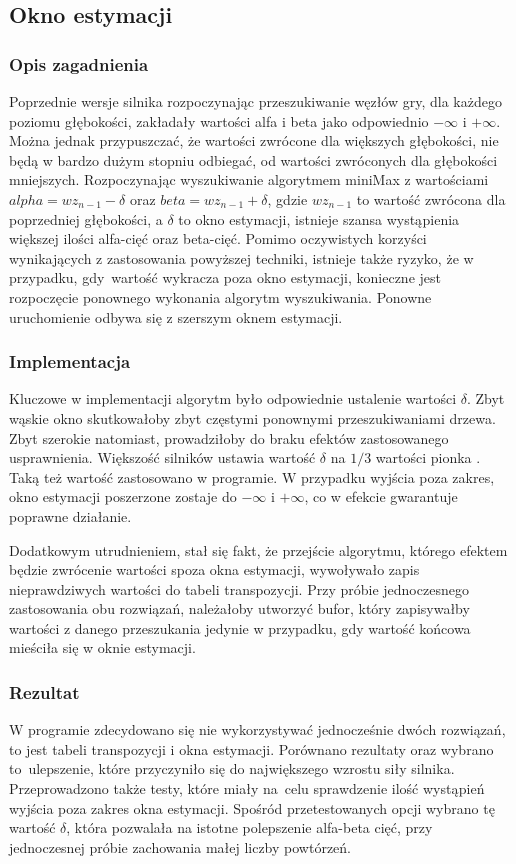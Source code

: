 \subsection{Okno estymacji}
\label{subsec:okno-estymacji}

\subsubsection{Opis zagadnienia}
Poprzednie wersje silnika rozpoczynając przeszukiwanie węzłów gry, dla każdego poziomu głębokości, zakładały wartości alfa i beta jako odpowiednio $-\infty$ i $+\infty$.
Można jednak przypuszczać, że wartości zwrócone dla większych głębokości, nie będą w bardzo dużym stopniu odbiegać, od wartości zwróconych dla głębokości mniejszych.
Rozpoczynając wyszukiwanie algorytmem miniMax z wartościami $alpha = wz_{n-1} - \delta$ oraz $beta = wz_{n-1} + \delta$, gdzie $wz_{n-1}$ to wartość zwrócona dla poprzedniej głębokości, a $\delta$ to okno estymacji, istnieje szansa wystąpienia większej ilości alfa-cięć oraz beta-cięć.
Pomimo oczywistych korzyści wynikających z zastosowania powyższej techniki, istnieje także ryzyko, że w przypadku, gdy~wartość wykracza poza okno estymacji, konieczne jest rozpoczęcie ponownego wykonania algorytm wyszukiwania.
Ponowne uruchomienie odbywa się z szerszym oknem estymacji.

\subsubsection{Implementacja}
Kluczowe w implementacji algorytm było odpowiednie ustalenie wartości $\delta$.
Zbyt wąskie okno skutkowałoby zbyt częstymi ponownymi przeszukiwaniami drzewa.
Zbyt szerokie natomiast, prowadziłoby do braku efektów zastosowanego usprawnienia.
Większość silników ustawia wartość $\delta$ na $1/3$ wartości pionka \cite*{duch}.
Taką też wartość zastosowano w programie.
W przypadku wyjścia poza zakres, okno estymacji poszerzone zostaje do $-\infty$ i $+\infty$, co w efekcie gwarantuje poprawne działanie.

Dodatkowym utrudnieniem, stał się fakt, że przejście algorytmu, którego efektem będzie zwrócenie wartości spoza okna estymacji, wywoływało zapis nieprawdziwych wartości do tabeli transpozycji.
Przy próbie jednoczesnego zastosowania obu rozwiązań, należałoby utworzyć bufor, który zapisywałby wartości z danego przeszukania jedynie w przypadku, gdy wartość końcowa mieściła się w oknie estymacji.

\subsubsection{Rezultat}
W programie zdecydowano się nie wykorzystywać jednocześnie dwóch rozwiązań, to jest tabeli transpozycji i okna estymacji.
Porównano rezultaty oraz wybrano to~ulepszenie, które przyczyniło się do największego wzrostu siły silnika.
Przeprowadzono także testy, które miały na~celu sprawdzenie ilość wystąpień wyjścia poza zakres okna estymacji.
Spośród przetestowanych opcji wybrano tę wartość $\delta$, która pozwalała na istotne polepszenie alfa-beta cięć, przy jednoczesnej próbie zachowania małej liczby powtórzeń.